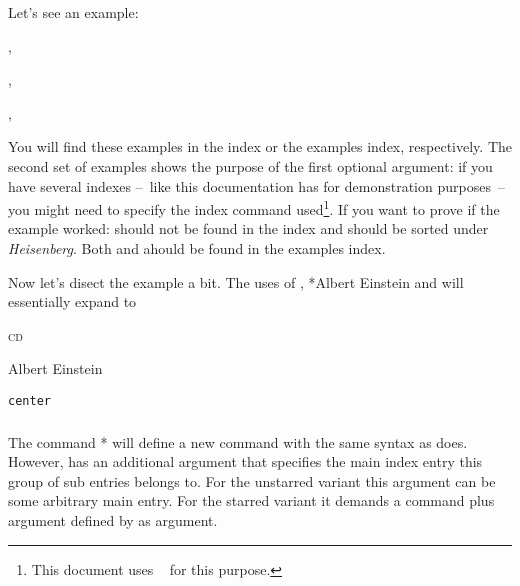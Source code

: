 \documentclass{cnpkgdoc}
\begin{document}
Let's see an example:
\begin{beispiel}
 , 
 
 , 

 , 
\end{beispiel}
You will find these examples in the index or the examples index,
respectively.  The second set of examples shows the purpose of the first
optional argument: if you have several indexes --~like this documentation has
for demonstration purposes~-- you might need to specify the index command
used\footnote{This document uses ~\cite{pkg:imakeidx} for
  this purpose.}.  If you want to prove if the example worked:  should not be found in the index and 
should be sorted under \emph{Heisenberg}.  Both  and
 ahould be found in the examples index.

Now let's disect the example a bit.  The uses of ,
*{Albert Einstein} and  will essentially
expand to
\begin{beispiel}
 \textsc{cd}

 \textsf{Albert Einstein}

 \texttt{center}
\end{beispiel}

\subsubsection{}\label{ssec:command:usage:newsubidxcmd}
The command *{} will define a new command  with the same syntax as
 does.  However,  has an additional argument
that specifies the main index entry this group of sub entries belongs to.  For
the unstarred variant this argument can be some arbitrary main entry.  For the
starred variant it demands a command plus argument defined by 
as argument.
\end{document}
